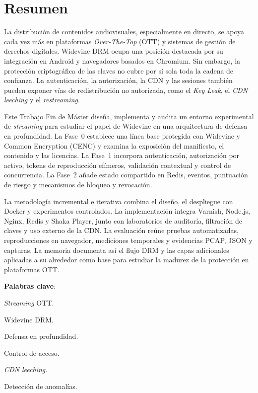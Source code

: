 
\pagestyle{fancy}
\renewcommand{\headrulewidth}{0pt}
\chapter*{Resumen}

La distribución de contenidos audiovisuales, especialmente en directo, se apoya cada vez más en plataformas \textit{Over-The-Top} (OTT) y sistemas de gestión de derechos digitales. Widevine DRM ocupa una posición destacada por su integración en Android y navegadores basados en Chromium. Sin embargo, la protección criptográfica de las claves no cubre por sí sola toda la cadena de confianza. La autenticación, la autorización, la CDN y las sesiones también pueden exponer vías de redistribución no autorizada, como el \textit{Key Leak}, el \textit{CDN leeching} y el \textit{restreaming}.

Este Trabajo Fin de Máster diseña, implementa y audita un entorno experimental de \textit{streaming} para estudiar el papel de Widevine en una arquitectura de defensa en profundidad. La Fase~0 establece una línea base protegida con Widevine y Common Encryption (CENC) y examina la exposición del manifiesto, el contenido y las licencias. La Fase~1 incorpora autenticación, autorización por activo, tokens de reproducción efímeros, validación contextual y control de concurrencia. La Fase~2 añade estado compartido en Redis, eventos, puntuación de riesgo y mecanismos de bloqueo y revocación.

La metodología incremental e iterativa combina el diseño, el despliegue con Docker y experimentos controlados. La implementación integra Varnish, Node.js, Nginx, Redis y Shaka Player, junto con laboratorios de auditoría, filtración de claves y uso externo de la CDN. La evaluación reúne pruebas automatizadas, reproducciones en navegador, mediciones temporales y evidencias PCAP, JSON y capturas. La memoria documenta así el flujo DRM y las capas adicionales aplicadas a su alrededor como base para estudiar la madurez de la protección en plataformas OTT.

\mbox{} \bigskip

\noindent \textbf{Palabras clave}:
\begin{compactitem}
    \item \textit{Streaming} OTT.
    \item Widevine DRM.
    \item Defensa en profundidad.
    \item Control de acceso.
    \item \textit{CDN leeching}.
    \item Detección de anomalías.
\end{compactitem}

